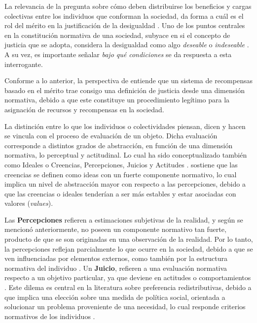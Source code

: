 \documentclass[12pt]{article}
\begin{document}
La relevancia de la pregunta sobre cómo deben distribuirse los beneficios y cargas colectivas entre los individuos que conforman la sociedad, da forma a cuál es el rol del mérito en la justificación de la desigualdad \citep{Burkhart2008,Janmaat2013}. Uno de los puntos centrales en la constitución normativa de una sociedad, subyace en si el concepto de justicia que se adopta, considera la desigualdad como algo \textit{deseable} o \textit{indeseable} \citep{Jasso2017}. A su vez, es importante señalar \textit{bajo qué condiciones} se da respuesta a esta interrogante. 

Conforme a lo anterior, la perspectiva de \citet{Sen2000} entiende que un sistema de recompensas basado en el mérito trae consigo una definición de justicia desde una dimensión normativa, debido a que este constituye un procedimiento legítimo para la asignación de recursos y recompensas en la sociedad. 
	
La distinción entre lo que los individuos o colectividades piensan, dicen y hacen \citep{Jasso2015} se vincula con el proceso de evaluación de un objeto. Dicha evaluación corresponde a distintos grados de abstracción, en función de una dimensión normativa, lo  perceptual y actitudinal. Lo cual ha sido conceptualizado también como Ideales o Creencias, Percepciones, Juicios y Actitudes \citep{Burkhart2008,Janmaat2013}. \citet{Janmaat2013} sostiene que las creencias se definen como ideas con un fuerte componente normativo, lo cual implica un nivel de abstracción mayor con respecto a las percepciones, debido a que las creencias o ideales tenderían a ser más estables y estar asociadas con valores (\textit{values}). 

Las \textbf{Percepciones} refieren a estimaciones subjetivas de la realidad, y según se mencionó anteriormente, no poseen un componente normativo tan fuerte, producto de que se son originadas en una observación de la realidad. Por lo tanto, la percepciones reflejan parcialmente lo que ocurre en la sociedad, debido a que se ven influenciadas por elementos externos, como también por la estructura normativa del individuo \citep{Burkhart2008, Feldman2001,Han2012,Janmaat2013}. Un \textbf{Juicio}, refieren a una evaluación normativa respecto a un objetivo particular, ya que deviene en actitudes o comportamientos \citep{Janmaat2013}. Este dilema es central en la literatura sobre preferencia redistributivas, debido a que implica una elección sobre una medida de política social, orientada a solucionar un problema proveniente de una necesidad, lo cual responde criterios normativos de los individuos \citep{Druckman2000,Druckman2016a}.
\end{document}

